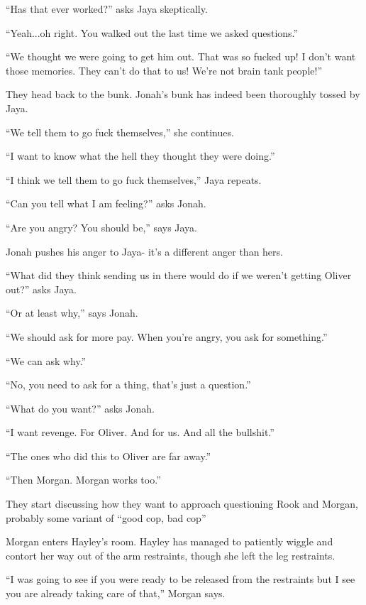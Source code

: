 ``Has that ever worked?'' asks Jaya skeptically.

``Yeah...oh right.  You walked out the last time we asked questions.''

``We thought we were going to get him out.  That was so fucked up!  I don't want those memories.  They can't do that to us!  We're not brain tank people!''



They head back to the bunk.  Jonah's bunk has indeed been thoroughly tossed by Jaya.

``We tell them to go fuck themselves,'' she continues.

``I want to know what the hell they thought they were doing.''

``I think we tell them to go fuck themselves,'' Jaya repeats.

``Can you tell what I am feeling?'' asks Jonah.

``Are you angry?  You should be,'' says Jaya.

Jonah pushes his anger to Jaya- it's a different anger than hers.



``What did they think sending us in there would do if we weren't getting Oliver out?'' asks Jaya.

``Or at least why,'' says Jonah.

``We should ask for more pay.  When you're angry, you ask for something.''

``We can ask why.''

``No, you need to ask for a thing, that's just a question.''

``What do you want?'' asks Jonah.

``I want revenge. For Oliver.  And for us.  And all the bullshit.''

``The ones who did this to Oliver are far away.''

``Then Morgan.  Morgan works too.''



They start discussing how they want to approach questioning Rook and Morgan, probably some variant of ``good cop, bad cop''





Morgan enters Hayley's room.  Hayley has managed to patiently wiggle and contort her way out of the arm restraints, though she left the leg restraints.  

``I was going to see if you were ready to be released from the restraints but I see you are already taking care of that,'' Morgan says.

